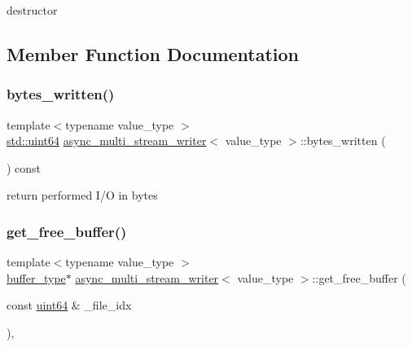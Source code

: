 destructor 



\subsection{Member Function Documentation}
\mbox{\label{classasync__multi__stream__writer_a196cb6d52ef0d06c585f9e6bba4384b5}} 
\subsubsection{\texorpdfstring{bytes\+\_\+written()}{bytes\_written()}}
{\footnotesize\ttfamily template$<$typename value\+\_\+type $>$ \\
\hyperlink{types_8h_a60e8696a4678cd348e991a1f172e53f7}{std\+::uint64} \hyperlink{classasync__multi__stream__writer}{async\+\_\+multi\+\_\+stream\+\_\+writer}$<$ value\+\_\+type $>$\+::bytes\+\_\+written (\begin{DoxyParamCaption}{ }\end{DoxyParamCaption}) const\hspace{0.3cm}{\ttfamily [inline]}}



return performed I/O in bytes 

\mbox{\label{classasync__multi__stream__writer_a2598da84bf94a7576d3910e8fc16a18d}} 
\subsubsection{\texorpdfstring{get\+\_\+free\+\_\+buffer()}{get\_free\_buffer()}}
{\footnotesize\ttfamily template$<$typename value\+\_\+type $>$ \\
\hyperlink{classasync__multi__stream__writer_ae11c006e394241a9a5b003a30e8c8c92}{buffer\+\_\+type}$\ast$ \hyperlink{classasync__multi__stream__writer}{async\+\_\+multi\+\_\+stream\+\_\+writer}$<$ value\+\_\+type $>$\+::get\+\_\+free\+\_\+buffer (\begin{DoxyParamCaption}\item[{const \hyperlink{types_8h_a60e8696a4678cd348e991a1f172e53f7}{uint64} \&}]{\+\_\+file\+\_\+idx }\end{DoxyParamCaption})\hspace{0.3cm}{\ttfamily [inline]}, {\ttfamily [private]}}



